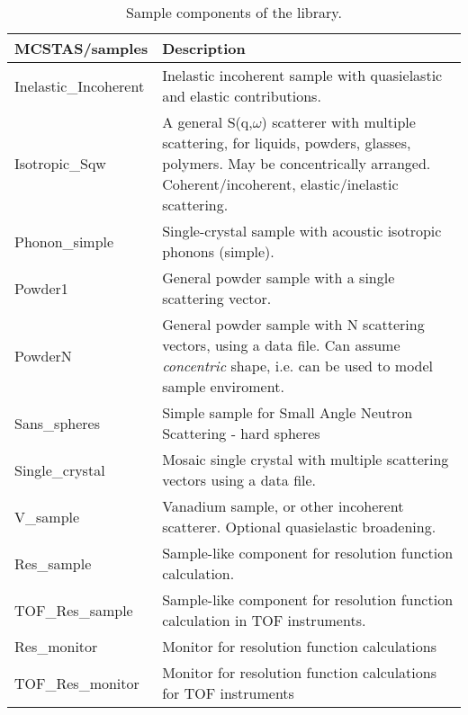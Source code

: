 \begin{table}
  \begin{center}
    {\let\my=\\
    \begin{tabular}{|p{}|p{}|}
      \hline
       {\bf MCSTAS/samples} & Description \\
       \hline
  Inelastic\_Incoherent & Inelastic incoherent sample with quasielastic and elastic contributions. \\
  Isotropic\_Sqw & A general S(q,$\omega$) scatterer with multiple scattering, for liquids, powders, glasses, polymers. May be concentrically arranged. Coherent/incoherent, elastic/inelastic scattering. \\
  Phonon\_simple   & Single-crystal sample with acoustic isotropic phonons (simple). \\
  Powder1      &  General powder sample with a single
                scattering vector. \\
  PowderN      &  General powder sample with N
                scattering vectors, using a data file. Can assume \emph{concentric} shape,
		i.e. can be used to model sample enviroment.\\
  Sans\_spheres  & Simple sample for Small Angle Neutron Scattering - hard spheres \\
  Single\_crystal & Mosaic single crystal with multiple scattering vectors
                    using a data file. \\
  V\_sample      & Vanadium sample, or other incoherent
  scatterer. Optional quasielastic broadening.\\ \hline

    Res\_sample   & Sample-like component for resolution function calculation. \\
  TOF\_Res\_sample   & Sample-like component for resolution function calculation in TOF instruments. \\
Res\_monitor      &   Monitor for resolution function calculations \\
TOF\_Res\_monitor      &   Monitor for resolution function calculations
                        for TOF instruments \\ \hline
    \end{tabular}
    \caption{Sample components of the \MCS library.}
    \label{t:comp-samples}
    }
  \end{center}
\end{table}

